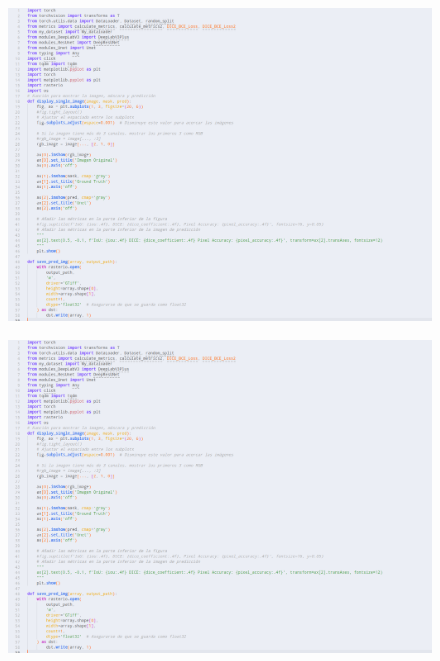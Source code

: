 \begin{figure}[h!]
	\centering
	\includegraphics[width=0.9\linewidth]{graficos/pred}
\end{figure}

\begin{figure}[h!]
	\centering
	\includegraphics[width=0.9\linewidth]{graficos/pred}
\end{figure}

